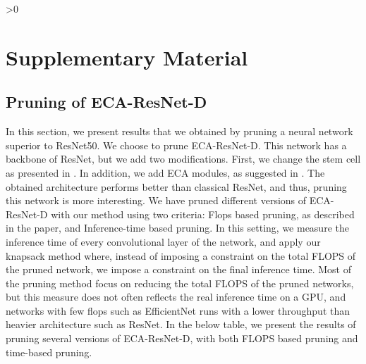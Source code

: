 \documentclass{article}
\newcommand\arxiv{1}
\begin{document}
\ifnum \arxiv>0

\section{Supplementary Material}

\subsection{Pruning of ECA-ResNet-D}
In this section, we present results that we obtained by pruning a neural network superior to ResNet50. We choose to prune ECA-ResNet-D. This network has a backbone of ResNet, but we add two modifications. First, we change the stem cell as presented in \cite{bag_of_tricks}. In addition, we add ECA modules, as suggested in \cite{ecaresnet}.
The obtained architecture performs better than classical ResNet, and thus, pruning this network is more interesting.
We have pruned different versions of ECA-ResNet-D with our method using two criteria: Flops based pruning, as described in the paper, and Inference-time based pruning. In this setting, we measure the inference time of every convolutional layer of the network, and apply our knapsack method where, instead of imposing a constraint on the total FLOPS of the pruned network, we impose a constraint on the final inference time.
Most of the pruning method focus on reducing the total FLOPS of the pruned networks, but this measure does not often reflects the real inference time on a GPU, and networks with few flops such as EfficientNet \cite{EfficientNet} runs with a lower throughput than heavier architecture such as ResNet. 
In the below table, we present the results of pruning several versions of ECA-ResNet-D, with both FLOPS based pruning and time-based pruning.
\end{document}
